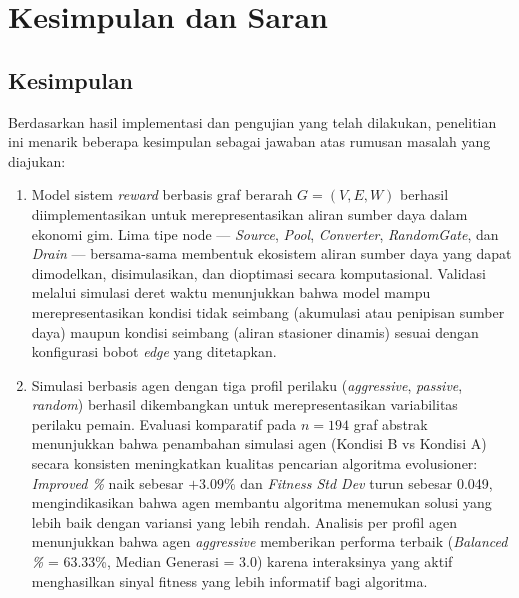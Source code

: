 \chapter{Kesimpulan dan Saran}
    \section{Kesimpulan}

        Berdasarkan hasil implementasi dan pengujian yang telah dilakukan, penelitian ini menarik beberapa kesimpulan sebagai jawaban atas rumusan masalah yang diajukan:

        \begin{enumerate}
            \item Model sistem \textit{reward} berbasis graf berarah $G = (V, E, W)$ berhasil diimplementasikan untuk merepresentasikan aliran sumber daya dalam ekonomi gim. Lima tipe node — \textit{Source}, \textit{Pool}, \textit{Converter}, \textit{RandomGate}, dan \textit{Drain} — bersama-sama membentuk ekosistem aliran sumber daya yang dapat dimodelkan, disimulasikan, dan dioptimasi secara komputasional. Validasi melalui simulasi deret waktu menunjukkan bahwa model mampu merepresentasikan kondisi tidak seimbang (akumulasi atau penipisan sumber daya) maupun kondisi seimbang (aliran stasioner dinamis) sesuai dengan konfigurasi bobot \textit{edge} yang ditetapkan.

            \item Simulasi berbasis agen dengan tiga profil perilaku (\textit{aggressive}, \textit{passive}, \textit{random}) berhasil dikembangkan untuk merepresentasikan variabilitas perilaku pemain. Evaluasi komparatif pada $n = 194$ graf abstrak menunjukkan bahwa penambahan simulasi agen (Kondisi B vs Kondisi A) secara konsisten meningkatkan kualitas pencarian algoritma evolusioner: \textit{Improved \%} naik sebesar $+3.09\%$ dan \textit{Fitness Std Dev} turun sebesar 0.049, mengindikasikan bahwa agen membantu algoritma menemukan solusi yang lebih baik dengan variansi yang lebih rendah. Analisis per profil agen menunjukkan bahwa agen \textit{aggressive} memberikan performa terbaik (\textit{Balanced \%} = 63.33\%, Median Generasi = 3.0) karena interaksinya yang aktif menghasilkan sinyal fitness yang lebih informatif bagi algoritma.


\end{enumerate}
